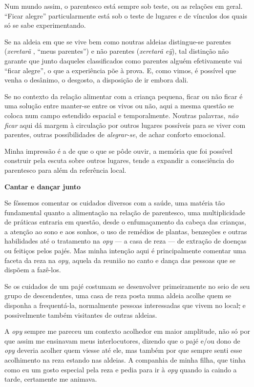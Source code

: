 Num mundo assim, o parentesco está sempre sob teste, ou as relações em
geral. ``Ficar alegre'' particularmente está sob o teste de lugares e de
vínculos dos quais só se sabe experimentando.

Se na aldeia em que se vive bem como noutras aldeias distingue-se
parentes (\emph{xeretarã} , ``meus parentes'') e não parentes
(\emph{xeretarã eÿ}), tal distinção não garante que junto daqueles
classificados como parentes alguém efetivamente vai ``ficar alegre'', o
que a experiência põe à prova. E, como vimos, é possível que venha o
desânimo, o desgosto, a disposição de ir embora dali.

Se no contexto da relação alimentar com a criança pequena, ficar ou não
ficar é uma solução entre manter-se entre os vivos ou não, aqui a mesma
questão se coloca num campo estendido espacial e temporalmente. Noutras
palavras, \emph{não ficar} aqui dá margem à circulação por outros
lugares possíveis para se viver com parentes, outras possibilidades de
\emph{alegrar-se}, de achar conforto emocional.

Minha impressão é a de que o que se pôde ouvir, a memória que foi
possível construir pela escuta sobre outros lugares, tende a expandir a
consciência do parentesco para além da referência local.

\textbf{Cantar e dançar junto}

Se fôssemos comentar os cuidados diversos com a saúde, uma matéria tão
fundamental quanto a alimentação na relação de parentesco, uma
multiplicidade de práticas entraria em questão, desde o enfumaçamento da
cabeça das crianças, a atenção ao sono e aos sonhos, o uso de remédios
de plantas, benzeções e outras habilidades até o tratamento na
\emph{opy} --- a casa de reza --- de extração de doenças ou feitiços
pelos pajés. Mas minha intenção aqui é principalmente comentar uma
faceta da reza na \emph{opy}, aquela da reunião no canto e dança das
pessoas que se dispõem a fazê-los.

Se os cuidados de um pajé costumam se desenvolver primeiramente no seio
de seu grupo de descendentes, uma casa de reza posta numa aldeia acolhe
quem se disponha a frequentá-la, normalmente pessoas interessadas que
vivem no local\sout{,} e possivelmente também visitantes de outras
aldeias.

A \emph{opy} sempre me pareceu um contexto acolhedor em maior amplitude,
não só por que assim me ensinavam meus interlocutores, dizendo que o
pajé e/ou dono de \emph{opy} deveria acolher quem viesse até ele, mas
também por que sempre senti esse acolhimento na reza estando nas
aldeias. A companhia de minha filha, que tinha como eu um gosto especial
pela reza e pedia para ir à \emph{opy} quando ia caindo a tarde,
certamente me animava.

